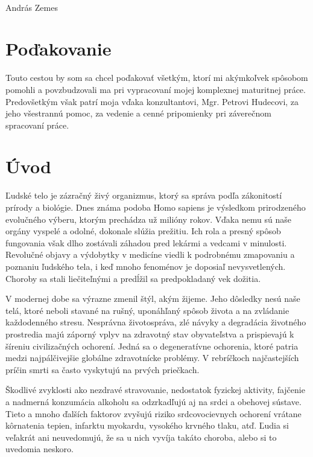 \documentclass[titlepage,12pt]{article}
\begin{document}
\vspace{10mm}
\hrulefill
\\\hspace*{0mm}\phantom{v.r.: }András Zemes

\newpage
\vspace*{\fill}
\section*{Poďakovanie}
Touto cestou by som sa chcel poďakovať všetkým, ktorí mi akýmkoľvek spôsobom pomohli a povzbudzovali ma pri vypracovaní mojej komplexnej maturitnej práce. Predovšetkým však patrí moja vďaka konzultantovi, Mgr. Petrovi Hudecovi, za jeho všestrannú pomoc, za vedenie a cenné pripomienky pri záverečnom spracovaní práce.

\newpage
\tableofcontents

\newpage
\section{Úvod}
Ľudské telo je zázračný živý organizmus, ktorý sa správa podľa zákonitostí prírody a biológie. Dnes známa podoba Homo sapiens je výsledkom prirodzeného evolučného výberu, ktorým prechádza už milióny rokov. Vďaka nemu sú naše orgány vyspelé a odolné, dokonale slúžia prežitiu. Ich rola a presný spôsob fungovania však dlho zostávali záhadou pred lekármi a vedcami v minulosti. Revolučné objavy a výdobytky v medicíne viedli k podrobnému zmapovaniu \linebreak a poznaniu ľudského tela, i keď mnoho fenoménov je doposiaľ nevysvetlených. Choroby sa stali liečiteľnými a predĺžil sa predpokladaný vek dožitia.

V modernej dobe sa výrazne zmenil štýl, akým žijeme. Jeho dôsledky nesú naše telá, ktoré neboli stavané na rušný, uponáhľaný spôsob života a na zvládanie každodenného stresu. Nesprávna životospráva, zlé návyky a degradácia životného prostredia majú záporný vplyv na zdravotný stav obyvateľstva a prispievajú k šíreniu civilizačných ochorení. Jedná sa o degeneratívne ochorenia, ktoré patria medzi najpálčivejšie globálne zdravotnícke problémy. \linebreak V rebríčkoch najčastejších príčin smrti sa často vyskytujú na prvých priečkach.

Škodlivé zvyklosti ako nezdravé stravovanie, nedostatok fyzickej aktivity, fajčenie a nadmerná konzumácia alkoholu sa odzrkadľujú aj na srdci a obehovej sústave. Tieto a mnoho ďalších faktorov zvyšujú riziko srdcovocievnych ochorení vrátane kôrnatenia tepien, infarktu myokardu, vysokého krvného tlaku, atď. Ľudia si veľakrát ani neuvedomujú, že sa u nich vyvíja takáto choroba, alebo si to uvedomia neskoro.
\end{document}
